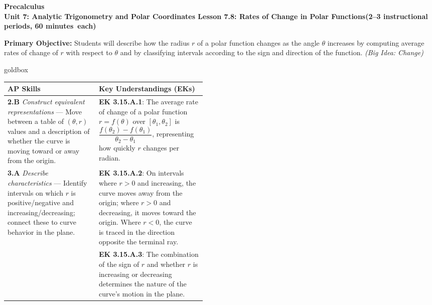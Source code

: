 \documentclass[10pt]{article}
\newcommand{\CourseName}{Precalculus}
\newcommand{\MeetingLength}{60 minutes}
\newcommand{\UnitNumberName}{Unit 7: Analytic Trigonometry and Polar Coordinates \quad}
\newcommand{\LessonNumberName}{Lesson 7.8: Rates of Change in Polar Functions}
\begin{document}
\begin{center}
  {\Large\bfseries \CourseName} \\[4pt]
  {\small\bfseries \UnitNumberName \LessonNumberName \quad (2--3 instructional periods, \MeetingLength\ each)}
\end{center}

\begin{tcolorbox}[colback=sky, colframe=navy, boxrule=0.9pt, arc=2mm,
    left=2mm, right=2mm, top=1.5mm, bottom=1.5mm]
  \textbf{Primary Objective:} Students will describe how the radius $r$ of a polar
  function changes as the angle $\theta$ increases by computing average rates of change
  of $r$ with respect to $\theta$ and by classifying intervals according to the sign
  and direction of the function. \textit{(Big Idea: Change)}
\end{tcolorbox}

\vspace{0.08in}

\begin{skillbox}{goldbox}
\begin{tabularx}{\linewidth}{@{} p{0.46\linewidth} X @{}}
\textbf{AP Skills} & \textbf{Key Understandings (EKs)} \\
\midrule
\textbf{2.B} \textit{Construct equivalent representations} ---
  Move between a table of $(θ, r)$ values and a description of whether
  the curve is moving toward or away from the origin.
&
\textbf{EK 3.15.A.1}: The average rate of change of a polar function
$r = f(\theta)$ over $[\theta_1, \theta_2]$ is
$\dfrac{f(\theta_2) - f(\theta_1)}{\theta_2 - \theta_1}$, representing
how quickly $r$ changes per radian. \\[6pt]

\textbf{3.A} \textit{Describe characteristics} ---
  Identify intervals on which $r$ is positive/negative and
  increasing/decreasing; connect these to curve behavior in the plane.
&
\textbf{EK 3.15.A.2}: On intervals where $r > 0$ and increasing, the
curve moves away from the origin; where $r > 0$ and decreasing, it
moves toward the origin. Where $r < 0$, the curve is traced in the
direction opposite the terminal ray. \\[6pt]

&
\textbf{EK 3.15.A.3}: The combination of the sign of $r$ and whether $r$
is increasing or decreasing determines the nature of the curve's motion
in the plane. \\
\end{tabularx}
\end{skillbox}
\end{document}
